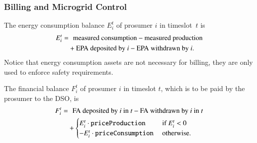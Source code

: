 \subsubsection{Billing and Microgrid Control}

The energy consumption balance $E_i^t$ of prosumer $i$ in timeslot~$t$ is
\begin{align*}
E_i^t = & \hphantom{+} \text{measured consumption} - \text{measured production} \\
 & + \text{EPA deposited by $i$} - \text{EPA withdrawn by $i$} .
\end{align*}
Notice that energy consumption assets are not necessary for billing, they are only used to enforce safety requirements.

The financial balance $F_i^t$ of prosumer $i$ in timeslot $t$, which is to be paid by the prosumer to the DSO, is
\begin{align*}
F_i^t = & \hphantom{+} \text{FA deposited by $i$ in $t$} - \text{FA withdrawn by $i$ in $t$} \\
 & + \begin{cases}
E_i^t \cdot \texttt{priceProduction} & \text{ if } E_i^t < 0 \\
- E_i^t \cdot \texttt{priceConsumption} & \text{ otherwise.} 
\end{cases}
\end{align*}


